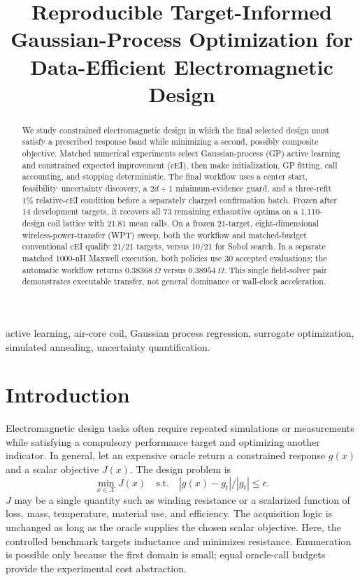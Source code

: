 \documentclass[conference]{IEEEtran}
\title{Reproducible Target-Informed Gaussian-Process Optimization for Data-Efficient Electromagnetic Design}
\author{\IEEEauthorblockN{Le Dong}
\IEEEauthorblockA{\textit{School of Electrical Engineering}\\
\textit{Xi'an Jiaotong University}\\
Xi'an, Shaanxi 710049, China\\
leroi\_2024@stu.xjtu.edu.cn}}
\begin{document}
\maketitle

\begin{abstract}
We study constrained electromagnetic design in which the final selected design must satisfy a prescribed response band while minimizing a second, possibly composite objective. Matched numerical experiments select Gaussian-process (GP) active learning and constrained expected improvement (cEI), then make initialization, GP fitting, call accounting, and stopping deterministic. The final workflow uses a center start, feasibility--uncertainty discovery, a $2d+1$ minimum-evidence guard, and a three-refit 1\% relative-cEI condition before a separately charged confirmation batch. Frozen after 14 development targets, it recovers all 73 remaining exhaustive optima on a 1,110-design coil lattice with 21.81 mean calls. On a frozen 21-target, eight-dimensional wireless-power-transfer (WPT) sweep, both the workflow and matched-budget conventional cEI qualify 21/21 targets, versus 10/21 for Sobol search. In a separate matched 1000-nH Maxwell execution, both policies use 30 accepted evaluations; the automatic workflow returns $0.38368~\Omega$ versus $0.38954~\Omega$. This single field-solver pair demonstrates executable transfer, not general dominance or wall-clock acceleration.
\end{abstract}

\begin{IEEEkeywords}
active learning, air-core coil, Gaussian process regression, surrogate optimization, simulated annealing, uncertainty quantification.
\end{IEEEkeywords}

\section{Introduction}
Electromagnetic design tasks often require repeated simulations or measurements while satisfying a compulsory performance target and optimizing another indicator. In general, let an expensive oracle return a constrained response $g(x)$ and a scalar objective $J(x)$. The design problem is
\begin{equation}
 \min_{x\in\mathcal X}J(x)\quad\mathrm{s.t.}\quad
 |g(x)-g_t|/|g_t|\leq\epsilon .
\end{equation}
$J$ may be a single quantity such as winding resistance or a scalarized function of loss, mass, temperature, material use, and efficiency. The acquisition logic is unchanged as long as the oracle supplies the chosen scalar objective. Here, the controlled benchmark targets inductance and minimizes resistance. Enumeration is possible only because the first domain is small; equal oracle-call budgets provide the experimental cost abstraction.
\end{document}
